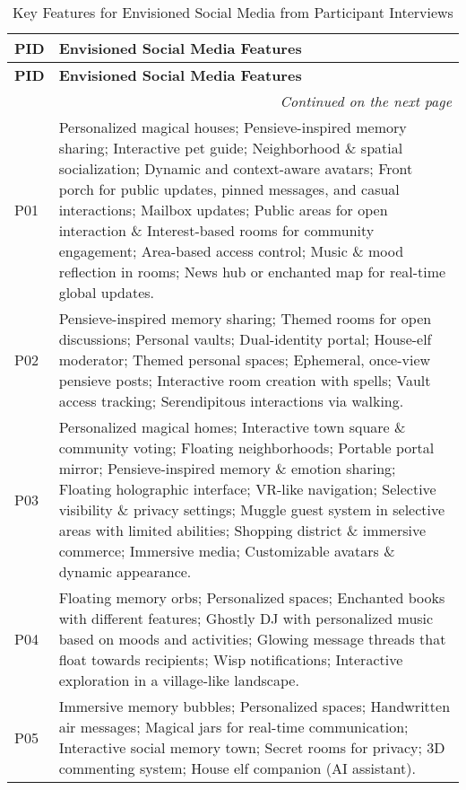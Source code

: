 \begingroup
\begin{spacing}{1.0}
\begin{longtable}{lp{13cm}}
    \caption{Key Features for Envisioned Social Media from Participant Interviews} \\
    \toprule
    \textbf{PID} & \textbf{Envisioned Social Media Features} \\
    \midrule
    \endfirsthead
    \toprule
    \textbf{PID} & \textbf{Envisioned Social Media Features} \\
    \midrule
    \endhead
    \midrule
    \multicolumn{2}{r}{\textit{Continued on the next page}} \\
    \midrule
    \endfoot
    \bottomrule
    \endlastfoot    
    P01 & Personalized magical houses; Pensieve-inspired memory sharing; Interactive pet guide; Neighborhood \& spatial socialization; Dynamic and context-aware avatars; Front porch for public updates, pinned messages, and casual interactions; Mailbox updates; Public areas for open interaction \& Interest-based rooms for community engagement; Area-based access control; Music \& mood reflection in rooms; News hub or enchanted map for real-time global updates. \\
    P02 & Pensieve-inspired memory sharing; Themed rooms for open discussions; Personal vaults; Dual-identity portal; House-elf moderator; Themed personal spaces; Ephemeral, once-view pensieve posts; Interactive room creation with spells; Vault access tracking; Serendipitous interactions via walking.\\
    P03 & Personalized magical homes; Interactive town square \& community voting; Floating neighborhoods; Portable portal mirror; Pensieve-inspired memory \& emotion sharing; Floating holographic interface; VR-like navigation; Selective visibility \& privacy settings; Muggle guest system in selective areas with limited abilities; Shopping district \& immersive commerce; Immersive media; Customizable avatars \& dynamic appearance.\\
    P04 & Floating memory orbs; Personalized spaces; Enchanted books with different features; Ghostly DJ with personalized music based on moods and activities; Glowing message threads that float towards recipients; Wisp notifications; Interactive exploration in a village-like landscape. \\
    P05 & Immersive memory bubbles; Personalized spaces; Handwritten air messages; Magical jars for real-time communication; Interactive social memory town; Secret rooms for privacy; 3D commenting system; House elf companion (AI assistant). \\

\end{longtable}
\end{spacing}
